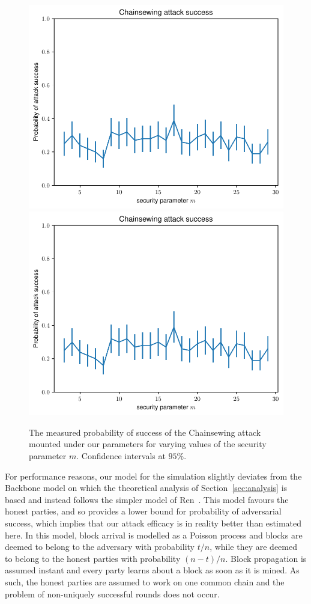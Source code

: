 \begin{figure}
	\begin{center}
		\iftwocolumn
			\includegraphics[width=0.99\columnwidth]{figures/attack-confidence.pdf}
		\else
			\includegraphics[width=0.7 \columnwidth]{figures/attack-confidence.pdf}
		\fi
	\end{center}
	\caption{The measured probability of success of the Chainsewing attack mounted under our parameters for varying values of the security parameter $m$. Confidence intervals at $95\%$.}
	\label{fig:confidence}
\end{figure}

For performance reasons, our model for the simulation slightly deviates from the Backbone model on which the theoretical analysis of Section~\ref{sec:analysis} is based and instead follows the simpler model of Ren~\cite{nakamoto-simple}. This model favours the honest parties, and so provides a lower bound for probability of adversarial success, which implies that our attack efficacy is in reality better than estimated here. In this model, block arrival is modelled as a Poisson process and blocks are deemed to belong to the adversary with probability $t / n$, while they are deemed to belong to the honest parties with probability $(n - t) / n$. Block propagation is assumed instant and every party learns about a block as soon as it is mined. As such, the honest parties are assumed to work on one common chain and the problem of non-uniquely successful rounds does not occur.


